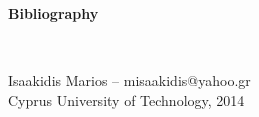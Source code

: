 \documentclass[12pt,a4paper,oneside]{article}
\begin{document}


\newpage
{}
{}
{\Huge \bf \noindent Bibliography}
\nocite{*}

\renewcommand{\refname}{}


\pagestyle{empty}
\label{sec:appendix}


\newpage
{}
\vspace*{\fill}
\hrulefill \\
\begin{center}
Isaakidis Marios -- misaakidis@yahoo.gr\\
Cyprus University of Technology, 2014
\end{center}
\end{document}
